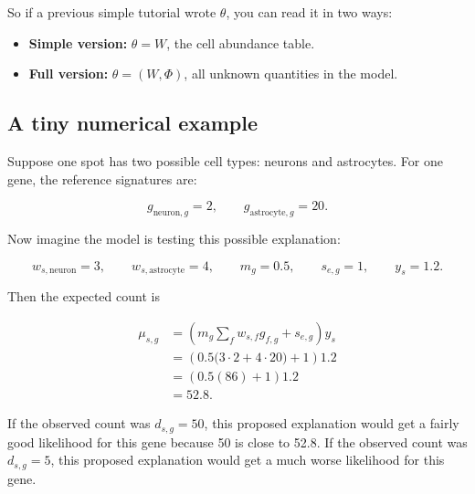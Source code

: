 \documentclass[11pt]{article}
\newcommand{\term}[1]{\textbf{#1}}
\begin{document}
So if a previous simple tutorial wrote \(\theta\), you can read it in two ways:

\begin{itemize}
  \item \term{Simple version:} \(\theta=W\), the cell abundance table.
  \item \term{Full version:} \(\theta=(W,\Phi)\), all unknown quantities in the model.
\end{itemize}

\subsection{A tiny numerical example}

Suppose one spot has two possible cell types: neurons and astrocytes. For one gene, the reference signatures are:

\[
g_{\mathrm{neuron},g}=2,
\qquad
 g_{\mathrm{astrocyte},g}=20.
\]

Now imagine the model is testing this possible explanation:

\[
w_{s,\mathrm{neuron}}=3,
\qquad
w_{s,\mathrm{astrocyte}}=4,
\qquad
m_g=0.5,
\qquad
s_{e,g}=1,
\qquad
y_s=1.2.
\]

Then the expected count is

\[
\begin{aligned}
\mu_{s,g}
&=\left(m_g\sum_f w_{s,f}g_{f,g}+s_{e,g}\right)y_s \\
&=\left(0.5\bigl(3\cdot 2+4\cdot 20\bigr)+1\right)1.2 \\
&=\left(0.5(86)+1\right)1.2 \\
&=52.8.
\end{aligned}
\]

If the observed count was \(d_{s,g}=50\), this proposed explanation would get a fairly good likelihood for this gene because 50 is close to 52.8. If the observed count was \(d_{s,g}=5\), this proposed explanation would get a much worse likelihood for this gene.
\end{document}
